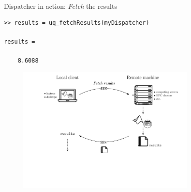 \documentclass[]{rsuqbeamernew}
\begin{document}
\begin{frame}[fragile]{Dispatcher in action: \emph{Fetch} the results}

\begin{lstlisting}[basicstyle=\scriptsize,numbers=none]
>> results = uq_fetchResults(myDispatcher)

results =

    8.6088
\end{lstlisting}
        
\begin{figure}[htbp]
  \centering
  \includegraphics[width= 0.8\textwidth]{./figures/dispatch-and-fetch-fetchResults.pdf}
\end{figure}
      
\end{frame}
\end{document}
